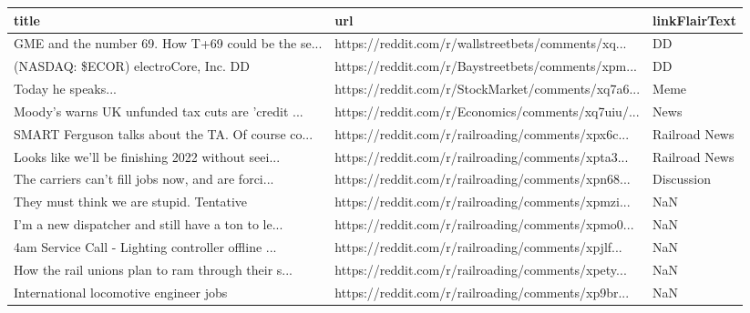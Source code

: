 \documentclass{article}%
\begin{document}
%


\begin{table}[htbp]%
\centering%
\begin{adjustbox}{width=1\textwidth}%
\begin{tabular}{lll}
\toprule
                                             title &                                                url & linkFlairText \\
\midrule
GME and the number 69. How T+69 could be the se... & https://reddit.com/r/wallstreetbets/comments/xq... &            DD \\
            (NASDAQ: \$ECOR) electroCore, Inc. {DD} & https://reddit.com/r/Baystreetbets/comments/xpm... &            DD \\
                                Today he speaks... & https://reddit.com/r/StockMarket/comments/xq7a6... &          Meme \\
Moody's warns UK unfunded tax cuts are 'credit ... & https://reddit.com/r/Economics/comments/xq7uiu/... &          News \\
SMART Ferguson talks about the TA. Of course co... & https://reddit.com/r/railroading/comments/xpx6c... & Railroad News \\
Looks like we'll be finishing 2022 without seei... & https://reddit.com/r/railroading/comments/xpta3... & Railroad News \\
The carriers can't fill jobs now, and are forci... & https://reddit.com/r/railroading/comments/xpn68... &    Discussion \\
       They must think we are stupid. Tentative #2 & https://reddit.com/r/railroading/comments/xpmzi... &           NaN \\
I’m a new dispatcher and still have a ton to le... & https://reddit.com/r/railroading/comments/xpmo0... &           NaN \\
4am Service Call - Lighting controller offline ... & https://reddit.com/r/railroading/comments/xpjlf... &           NaN \\
How the rail unions plan to ram through their s... & https://reddit.com/r/railroading/comments/xpety... &           NaN \\
            International locomotive engineer jobs & https://reddit.com/r/railroading/comments/xp9br... &           NaN \\
\bottomrule
\end{tabular}
%
\end{adjustbox}%
\end{table}

%
\end{document}
